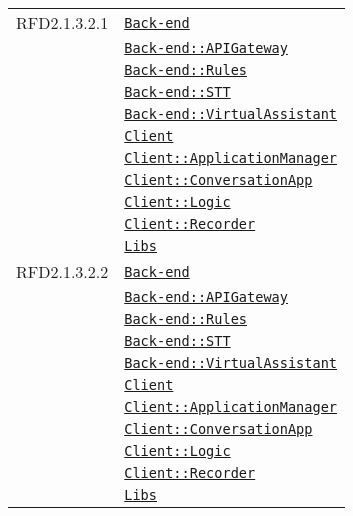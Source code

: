 \begin{longtable}{|>{\centering}m{3cm}|m{10cm}<{\centering}|}
RFD2.1.3.2.1 & \hyperref[Back-end]{\texttt{Back-end}}\\
& \hyperref[Back-end::APIGateway]{\texttt{Back-end::APIGateway}}\\
& \hyperref[Back-end::Rules]{\texttt{Back-end::Rules}}\\
& \hyperref[Back-end::STT]{\texttt{Back-end::STT}}\\
& \hyperref[Back-end::VirtualAssistant]{\texttt{Back-end::VirtualAssistant}}\\
& \hyperref[Client]{\texttt{Client}}\\
& \hyperref[Client::ApplicationManager]{\texttt{Client::ApplicationManager}}\\
& \hyperref[Client::ConversationApp]{\texttt{Client::ConversationApp}}\\
& \hyperref[Client::Logic]{\texttt{Client::Logic}}\\
& \hyperref[Client::Recorder]{\texttt{Client::Recorder}}\\
& \hyperref[Libs]{\texttt{Libs}}\\ \hline

RFD2.1.3.2.2 & \hyperref[Back-end]{\texttt{Back-end}}\\
& \hyperref[Back-end::APIGateway]{\texttt{Back-end::APIGateway}}\\
& \hyperref[Back-end::Rules]{\texttt{Back-end::Rules}}\\
& \hyperref[Back-end::STT]{\texttt{Back-end::STT}}\\
& \hyperref[Back-end::VirtualAssistant]{\texttt{Back-end::VirtualAssistant}}\\
& \hyperref[Client]{\texttt{Client}}\\
& \hyperref[Client::ApplicationManager]{\texttt{Client::ApplicationManager}}\\
& \hyperref[Client::ConversationApp]{\texttt{Client::ConversationApp}}\\
& \hyperref[Client::Logic]{\texttt{Client::Logic}}\\
& \hyperref[Client::Recorder]{\texttt{Client::Recorder}}\\
& \hyperref[Libs]{\texttt{Libs}}\\ \hline


\end{longtable}
